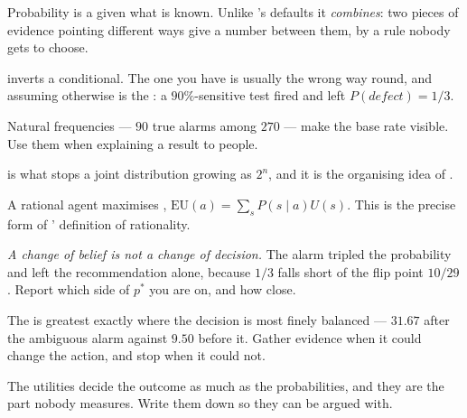 \begin{chaptersummary}
\begin{tight}
  \item Probability is a  given what is known. Unlike
        's defaults it \emph{combines}: two pieces of evidence pointing
        different ways give a number between them, by a rule nobody gets to choose.
  \item {} inverts a conditional. The one you have is usually the
        wrong way round, and assuming otherwise is the : a
        $90\%$-sensitive test fired and left $P(\mathit{defect}) = 1/3$.
  \item Natural frequencies --- $90$ true alarms among $270$ --- make the base rate
        visible. Use them when explaining a result to people.
  \item {} is what stops a joint distribution growing
        as $2^{n}$, and it is the organising idea of .
  \item A rational agent maximises ,
        $\mathrm{EU}(a) = \sum_{s} P(s \mid a) U(s)$. This is the precise form of
        ' definition of rationality.
  \item \emph{A change of belief is not a change of decision.} The alarm tripled
        the probability and left the recommendation alone, because $1/3$ falls
        short of the flip point $10/29$. Report which side of $p^{*}$ you are on,
        and how close.
  \item The  is greatest exactly where the
        decision is most finely balanced --- $31.67$ after the ambiguous alarm
        against $9.50$ before it. Gather evidence when it could change the action,
        and stop when it could not.
  \item The utilities decide the outcome as much as the probabilities, and they are
        the part nobody measures. Write them down so they can be argued with.
\end{tight}
\end{chaptersummary}

